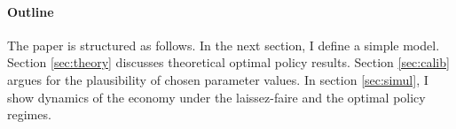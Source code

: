 

\paragraph{Outline}
The paper is structured as follows. In the next section, I define a simple model. %
Section \ref{sec:theory} discusses theoretical optimal policy results. Section \ref{sec:calib} argues for the plausibility of chosen parameter values. In section \ref{sec:simul}, I show dynamics of the economy under the laissez-faire and the optimal policy regimes. 

